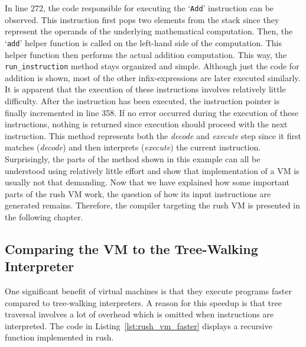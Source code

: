 In line 272, the code responsible for executing the `\texttt{Add}' instruction can be observed.
This instruction first pops two elements from the stack since they represent the operands of the underlying mathematical computation.
Then, the `\texttt{add}' helper function is called on the left-hand side of the computation.
This helper function then performs the actual addition computation.
This way, the \texttt{run\_instruction} method stays organized and simple.
Although just the code for addition is shown, most of the other infix-expressions are later executed similarly.
It is apparent that the execution of these instructions involves relatively little difficulty.
After the instruction has been executed, the instruction pointer is finally incremented in line 358.
If no error occurred during the execution of these instructions, nothing is returned since execution should proceed with the next instruction.
This method represents both the \emph{decode} and \emph{execute} step since it first matches (\emph{decode}) and then interprets (\emph{execute}) the current instruction.
Surprisingly, the parts of the method shown in this example can all be understood using relatively little effort and show that implementation of a VM is usually not that demanding.
Now that we have explained how some important parts of the rush VM work, the question of how its input instructions are generated remains.
Therefore, the compiler targeting the rush VM is presented in the following chapter.

\subsection{Comparing the VM to the Tree-Walking Interpreter}

One significant benefit of virtual machines is that they execute programs faster compared to tree-walking interpreters.
A reason for this speedup is that tree traversal involves a lot of overhead which is omitted when instructions are interpreted.
The code in Listing~\ref{lst:rush_vm_faster} displays a recursive function implemented in rush.


